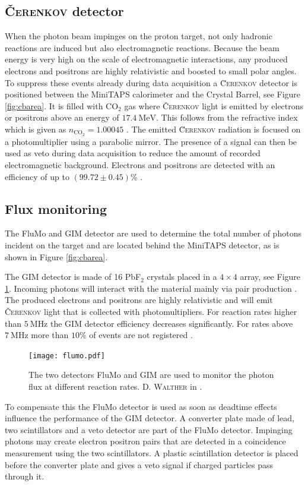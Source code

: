 \subsection{\textsc{\v Cerenkov} detector}
\label{sec:cerenkov}
When the photon beam impinges on the proton target, not only hadronic reactions are induced but also electromagnetic reactions. Because the beam energy is very high on the scale of electromagnetic interactions, any produced electrons and positrons are highly relativistic and boosted to small polar angles. To suppress these events already during data acquisition a \textsc{\u Cerenkov} detector \cite{cerenkov} is positioned between the MiniTAPS calorimeter and the Crystal Barrel, see Figure \ref{fig:cbarea}. It is filled with CO$_2$ gas where \textsc{\v Cerenkov} light is emitted by electrons or positrons above an energy of $\SI{17.4}{\mega\eV}$. This follows from the refractive index which is given as $n_{\text{CO}_2}=1.00045$ \cite{prop}. The emitted \textsc{\u Cerenkov} radiation is focused on a photomultiplier using a parabolic mirror. The presence of a signal can then be used as veto during data acquisition to reduce the amount of recorded electromagnetic background. Electrons and positrons are detected with an efficiency of up to $(99.72\pm0.45)\%$ \cite{cerenkov}.
\subsection{Flux monitoring}
\label{sec:flumo}
The FluMo and GIM detector are used to determine the total number of photons incident on the target and are located behind the MiniTAPS detector, as is shown in Figure \ref{fig:cbarea}.

The GIM detector \cite{gim} is made of 16 PbF$_2$ crystals placed in a $4\times4$ array, see Figure \ref{fig:gim}. Incoming photons will interact with the material mainly via pair production \cite{leo}. The produced electrons and positrons are highly relativistic and will emit \textsc{\v Cerenkov} light that is collected with photomultipliers. For reaction rates higher than $\SI{5}{\mega\Hz}$ the GIM detector efficiency decreases significantly. For rates above $\SI{7}{\mega\Hz}$ more than $10\%$ of events are not registered \cite{hartmanndipl}. 
\begin{figure}[htbp]
	\centering
	\texttt{[image: flumo.pdf]}
	\caption{The two detectors FluMo and GIM are used to monitor the photon flux at different reaction rates. \textsc{D. Walther} in \cite{farahphd}.}
	\label{fig:gim}
\end{figure}  
To compensate this the FluMo detector \cite{flumo} is used as soon as deadtime effects influence the performance of the GIM detector. A converter plate made of lead, two scintillators and a veto detector are part of the FluMo detector. Impinging photons may create electron positron pairs that are detected in a coincidence measurement using the two scintillators. A plastic scintillation detector is placed before the converter plate and gives a veto signal if charged particles pass through it.

